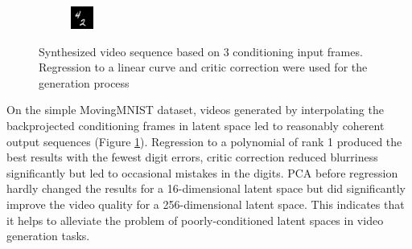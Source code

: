 \documentclass[10pt,twocolumn,letterpaper]{article}
\begin{document}
\begin{figure}[]
\begin{subfigure}[b]{0.038\textwidth}
	\end{subfigure}
	\begin{subfigure}[b]{0.038\textwidth}
		\centering
		\includegraphics[width=\textwidth]{graphics/interpolation_linear/9.png}
	\end{subfigure}
	

	\caption{Synthesized video sequence based on 3 conditioning input frames. Regression to a linear curve and critic correction were used for the generation process}
	\label{fig:output_sequence}
\end{figure}

On the simple MovingMNIST dataset, videos generated by interpolating the backprojected conditioning frames in latent space led to reasonably coherent output sequences (Figure \ref{fig:output_sequence}). Regression to a polynomial of rank 1 produced the best results with the fewest digit errors, critic correction reduced blurriness significantly but led to occasional mistakes in the digits. PCA before regression hardly changed the results for a 16-dimensional latent space but did significantly improve the video quality for a 256-dimensional latent space. This indicates that it helps to alleviate the problem of poorly-conditioned latent spaces in video generation tasks.

\end{document}
